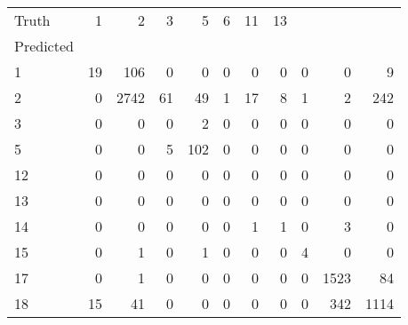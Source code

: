 \begin{tabular}{lrrrrrrrrrr}
\toprule
Truth & 1 & 2 & 3 & 5 & 6 & 11 & 13 \\
Predicted &  &  &  &  &  &  &  \\
\midrule
1 & 19 & 106 & 0 & 0 & 0 & 0 & 0 & 0 & 0 & 9 \\
2 & 0 & 2742 & 61 & 49 & 1 & 17 & 8 & 1 & 2 & 242 \\
3 & 0 & 0 & 0 & 2 & 0 & 0 & 0 & 0 & 0 & 0 \\
5 & 0 & 0 & 5 & 102 & 0 & 0 & 0 & 0 & 0 & 0 \\
12 & 0 & 0 & 0 & 0 & 0 & 0 & 0 & 0 & 0 & 0 \\
13 & 0 & 0 & 0 & 0 & 0 & 0 & 0 & 0 & 0 & 0 \\
14 & 0 & 0 & 0 & 0 & 0 & 1 & 1 & 0 & 3 & 0 \\
15 & 0 & 1 & 0 & 1 & 0 & 0 & 0 & 4 & 0 & 0 \\
17 & 0 & 1 & 0 & 0 & 0 & 0 & 0 & 0 & 1523 & 84 \\
18 & 15 & 41 & 0 & 0 & 0 & 0 & 0 & 0 & 342 & 1114 \\
\bottomrule
\end{tabular}
